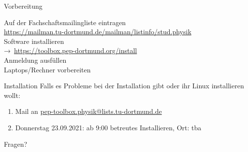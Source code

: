 \begin{frame}{Vorbereitung}
  \begin{center}
    \huge
    Auf der Fachschaftsmailingliste eintragen \\
    \url{https://mailman.tu-dortmund.de/mailman/listinfo/stud.physik}\\[0.5\baselineskip]
    Software installieren\\
    →~\textcolor{blue!70!black}{\url{https://toolbox.pep-dortmund.org/install}}\\[0.5\baselineskip]
    Anmeldung ausfüllen\\[0.5\baselineskip]
    Laptops/Rechner vorbereiten%
  \end{center}
\end{frame}
\begin{frame}{Installation}
  \huge
  Falls es Probleme bei der Installation gibt oder ihr Linux installieren wollt:\\[0.5\baselineskip]
  \begin{enumerate}
    \item Mail an \href{mailto:pep-toolbox.physik@lists.tu-dortmund.de}{pep-toolbox.physik@lists.tu-dortmund.de}
    \item Donnerstag 23.09.2021: ab 9:00 betreutes Installieren, Ort: tba
  \end{enumerate}
\end{frame}
\begin{frame}
  \Huge\centering
  \textcolor{red!70!black}{Fragen?}
\end{frame}

